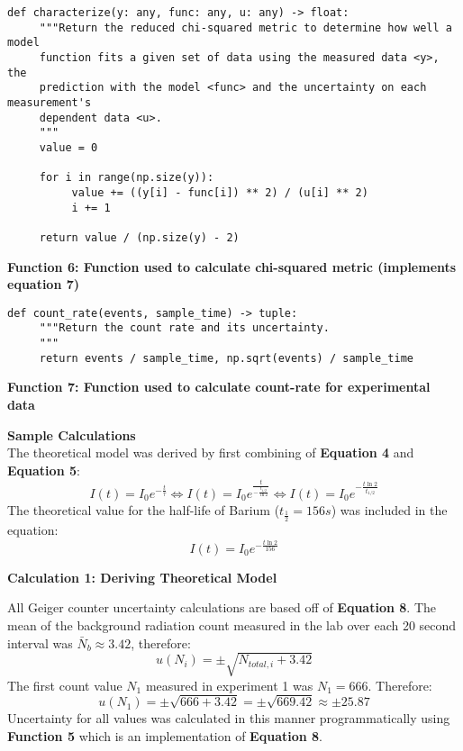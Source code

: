 \documentclass[
	letterpaper, %
	10pt, %
]{CSUniSchoolLabReport}
\begin{document}
\begin{verbatim}
def characterize(y: any, func: any, u: any) -> float:
     """Return the reduced chi-squared metric to determine how well a model
     function fits a given set of data using the measured data <y>, the
     prediction with the model <func> and the uncertainty on each measurement's
     dependent data <u>.
     """
     value = 0

     for i in range(np.size(y)):
          value += ((y[i] - func[i]) ** 2) / (u[i] ** 2)
          i += 1

     return value / (np.size(y) - 2)
\end{verbatim}
\begin{center}
	\textbf{Function 6: Function used to calculate chi-squared metric (implements equation 7)}
\end{center}
\vspace{5pt}
\begin{verbatim}
def count_rate(events, sample_time) -> tuple:
     """Return the count rate and its uncertainty.
     """
     return events / sample_time, np.sqrt(events) / sample_time
\end{verbatim}
\begin{center}
	\textbf{Function 7: Function used to calculate count-rate for experimental data}
\end{center}
\newpage %
{\Large\textbf{Sample Calculations}}
\vspace{20pt}\\
The theoretical model was derived by first combining of \textbf{Equation 4} and \textbf{Equation 5}:
$$I(t) = I_0e^{-\frac{t}{\tau}} \iff I(t) = I_0e^{\frac{t}{-\frac{t_{1/2}}{\ln{2}}}} \iff I(t) = I_0e^{-\frac{t\ln{2}}{t_{1/2}}}$$
The theoretical value for the half-life of Barium ($t_{\frac{1}{2}} = 156s$) was included in the equation:
$$I(t) = I_0e^{-\frac{t\ln{2}}{156}}$$
\begin{center}
	\textbf{Calculation 1: Deriving Theoretical Model}
\end{center}
\vspace{10pt}
All Geiger counter uncertainty calculations are based off of \textbf{Equation 8}. The mean of the background radiation count measured in the lab over each 20 second interval was $\bar{N}_b \approx 3.42$, therefore:
$$u(N_i) = \pm\sqrt{N_{total, i} + 3.42}$$
The first count value $N_1$ measured in experiment 1 was $N_1= 666$. Therefore:
$$u(N_1) = \pm\sqrt{666 + 3.42} = \pm\sqrt{669.42} \approx \pm25.87$$
Uncertainty for all values was calculated in this manner programmatically using \textbf{Function 5} which is an implementation of \textbf{Equation 8}.
\end{document}
